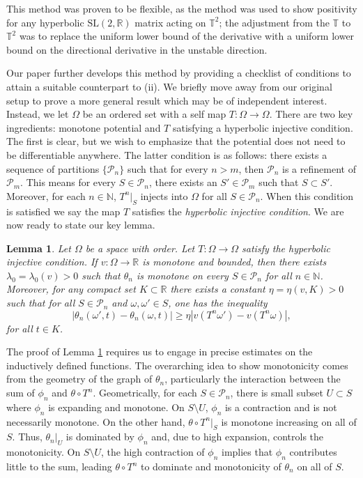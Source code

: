 \documentclass{amsart}
\newtheorem{lemma}{Lemma}
\newcommand{\NN}{\mathbb{N}}
\newcommand{\RR}{\mathbb{R}}
\newcommand{\TT}{\mathbb{T}}
\renewcommand{\P}{\mathcal{P}}
\begin{document}
This method was proven to be flexible, as the method was used to show positivity for any hyperbolic $\mathrm{SL}(2,\RR)$ matrix acting on $\TT^2$; the adjustment from the $\TT$ to $\TT^2$ was to replace the uniform lower bound of the derivative with a uniform lower bound on the directional derivative in the unstable direction. 

Our paper further develops this method by providing a checklist of conditions to attain a suitable counterpart to (ii). We briefly move away from our original setup to prove a more general result which may be of independent interest. Instead, we let $\Omega$ be an ordered set with a self map $T:\Omega \rightarrow \Omega$. There are two key ingredients: monotone potential and $T$ satisfying a hyperbolic injective condition. The first is clear, but we wish to emphasize that the potential does not need to be differentiable anywhere. The latter condition  is as follows: there exists a sequence of partitions $\{\P_n\}$ such that for every $n>m$, then $\P_n$ is a refinement of $\P_m$. This means for every $S\in \P_n$, there exists an $S'\in \P_m$ such that $S\subset S'$. Moreover, for each $n\in \NN$, $T^n|_S$ injects into $\Omega$ for all $S\in \P_n$. When this condition is satisfied we say the map $T$ satisfies the \textit{hyperbolic injective condition}. We are now ready to state our key lemma.

\begin{lemma}\label{l.key}
    Let $\Omega$ be a space with order. Let $T:\Omega \rightarrow \Omega$ satisfy the hyperbolic injective condition. If $v: \Omega \rightarrow \RR$ is monotone and bounded, then there exists $\lambda_0 = \lambda_0(v)>0$ such that $\theta_n$ is monotone on every $S\in \P_n$ for all $n\in \NN$. Moreover, for any compact set $K\subset \RR$ there exists a constant $\eta = \eta(v,K) > 0$ such that for all $S\in \P_n$ and   $\omega,\omega'\in S$, one has the inequality
    \begin{equation}\label{e.l.monotone}
        |\theta_n(\omega',t) - \theta_n(\omega,t)|\geq \eta|v(T^n\omega') - v(T^n\omega)|,
    \end{equation}
    for all $t\in K$.
\end{lemma}

The proof of Lemma \ref{l.key} requires us to engage in precise estimates on the inductively defined functions. The overarching idea to show monotonicity comes from the geometry of the graph of $\theta_n$, particularly the interaction between the sum of $\phi_n$ and $\theta\circ T^n$. Geometrically, for each $S\in \P_n$, there is small subset $U\subset S$ where $\phi_n$ is expanding and monotone. On $S\setminus U$, $\phi_n$ is a contraction and is not necessarily monotone. On the other hand, $\theta\circ T^n|_S$ is monotone increasing on all of $S$. Thus, $\theta_n|_U$ is dominated by $\phi_n$ and, due to high expansion, controls the monotonicity. On $S\setminus U$, the high contraction of $\phi_n$ implies that $\phi_n$ contributes little to the sum, leading $\theta\circ T^n$ to dominate and monotonicity of $\theta_n$ on all of $S$.
\end{document}

